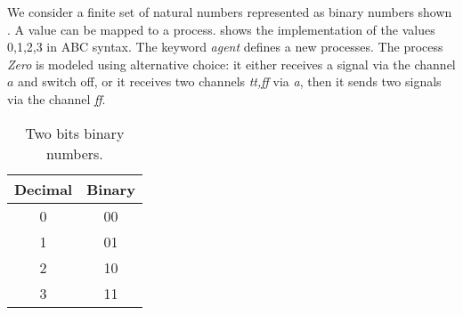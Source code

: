 We consider a finite set of natural numbers represented as binary numbers shown . A value can be mapped to a \picalc{} process.  shows the \picalc{} implementation of the values 0,1,2,3 in ABC syntax. The keyword \textit{agent} defines a new processes. The process \textit{Zero} is modeled using alternative choice: it either receives a signal via the channel $a$ and switch off, or it receives two channels \textit{tt,ff} via \textit{a}, then it sends two signals via the channel \textit{ff}.
\begin{table}[H]
\centering
\begin{tabular}{|c|c|}
\hline
Decimal & Binary \\ \hline
0       & 00     \\ \hline
1       & 01     \\ \hline
2       & 10     \\ \hline
3       & 11     \\ \hline
\end{tabular}%
\caption{Two bits binary numbers.}
\label{two_bit_binary_numbers}
\end{table}

